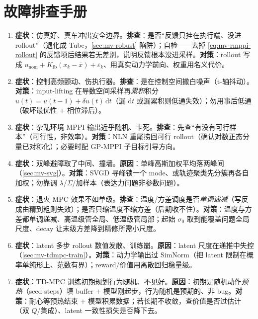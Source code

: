 \section*{故障排查手册}
\begin{enumerate}
  \item \textbf{症状}：仿真好、真车冲出安全边界。\textbf{排查}：是否“反馈只挂在执行端、没进 rollout”（退化成 Tube，\cref{sec:mv-robust} 陷阱）；自检——去掉 \cref{eq:mv-rmppi-rollout} 的反馈项后结果若无差别，说明反馈根本没进采样。\textbf{对策}：rollout 写成 $u_{\text{nom}}+K_{\text{fb}}(x_k-\bar x)+\varepsilon_k$、用真实动力学前向、权重用名义代价。
  \item \textbf{症状}：控制高频颤动、伤执行器。\textbf{排查}：是在控制空间撒白噪声（t-轴抖动）。\textbf{对策}：input-lifting 在导数空间采样再\emph{累积}积分 $u(t)=u(t{-}1)+\delta u(t)\,\mathrm{d}t$（漏 $\mathrm{d}t$ 或漏累积则低通失效）；勿用事后低通（破坏最优性 $+$ 相位滞后）。
  \item \textbf{症状}：杂乱环境 MPPI 输出近乎随机、卡死。\textbf{排查}：先查“有没有可行样本”（可行性，非效率）。\textbf{对策}：NLN 重尾捞回可行 rollout（确认对数正态分量已对称化）；必要时配 GP-MPPI 子目标引导方向。
  \item \textbf{症状}：双峰避障取了中间、撞墙。\textbf{原因}：单峰高斯加权平均落两峰间（\cref{sec:mv-svg}）。\textbf{对策}：SVGD 寻峰锁一个 mode、或轨迹聚类先分簇再各自加权；勿靠调 $\lambda$/$\Sigma$/加样本（表达力问题非参数问题）。
  \item \textbf{症状}：退火 MPC 效果不如单级。\textbf{排查}：温度/方差调度是否\emph{单调递减}（写反成由精到粗则失效）；是否只缩温度不缩方差（后期收不住）。\textbf{对策}：温度与方差都单调递减、高温级管全局、低温级管局部；起始 $\sigma_0$ 取到能覆盖问题全局尺度、$\mathrm{decay}$ 让末级方差降到精修所需小尺度。
  \item \textbf{症状}：latent 多步 rollout 数值发散、训练崩。\textbf{原因}：latent 尺度在递推中失控（\cref{sec:mv-tdmpc-train}）。\textbf{对策}：动力学输出过 SimNorm（把 latent 限制在概率单纯形上、范数有界）；reward/价值用离散回归稳量级。
  \item \textbf{症状}：TD-MPC 训练初期规划行为随机、不见好。\textbf{原因}：初期是随机动作\emph{预热}（seed steps）填 buffer $+$ 模型刚起步，行为随机是预期的、非 bug。\textbf{对策}：耐心等预热结束 $+$ 模型积累数据；若长期不收敛，查价值是否过估计（双 $Q$/集成）、latent 一致性损失是否降下去。
\end{enumerate}
